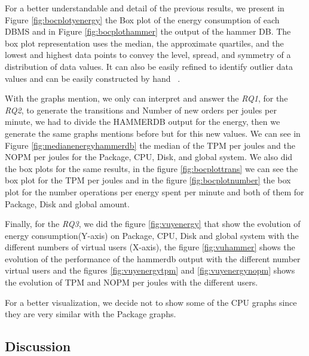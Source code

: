 For a better understandable and detail of the previous results, we present in Figure \ref{fig:bocplotyenergy} the Box plot of the energy consumption of each DBMS and in Figure \ref{fig:bocplothammer} the output of the hammer DB. The box plot representation uses the median, the approximate quartiles, and the lowest and highest data points to convey the level, spread, and symmetry of a distribution of data values. It can also be easily refined to identify outlier data values and can be easily constructed by hand ~\cite{doi:10.7326/0003-4819-110-11-916}.  %

With the graphs mention, we only can interpret and answer the \textit{RQ1}, for the \textit{RQ2}, to generate the transitions and Number of new orders per joules per minute, we had to divide the HAMMERDB  output for the energy, then we generate the same graphs mentions before but for this new values. We can see in Figure \ref{fig:medianenergyhammerdb} the median of the TPM per joules and the NOPM per joules for the Package, CPU, Disk, and global system. We also did the box plots for the same results, in the figure \ref{fig:bocplottrans} we can see the box plot for the  TPM per joules and in the figure \ref{fig:bocplotnumber} the box plot for the number operations per energy spent per minute and both of them for Package, Disk and global amount.

Finally, for the \textit{RQ3}, we did the figure \ref{fig:vuyenergy} that show the evolution of energy consumption(Y-axis) on Package, CPU, Disk and global system with the different numbers of virtual users (X-axis), the figure \ref{fig:vuhammer} shows the evolution of the performance of the hammerdb output with the different number virtual users and the figures \ref{fig:vuyenergytpm} and \ref{fig:vuyenergynopm}  shows the evolution of TPM and NOPM per joules with the different users.

For a better visualization, we decide not to show some of the CPU graphs since they are very similar with the Package graphs.

\subsection{Discussion}

